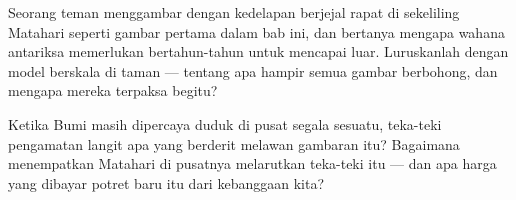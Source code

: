 \begin{exercise}[$\star\star$]\label{exo:g4:solar-system:10}
Seorang teman menggambar  dengan kedelapan  berjejal
rapat di sekeliling Matahari seperti gambar pertama dalam bab ini, dan
bertanya mengapa wahana antariksa memerlukan bertahun-tahun untuk
mencapai  luar. Luruskanlah dengan model berskala di taman ---
tentang apa hampir semua gambar  berbohong, dan mengapa
mereka terpaksa begitu?
\end{exercise}

\begin{exercise}[$\star\star$]\label{exo:g4:solar-system:11}
Ketika Bumi masih dipercaya duduk di pusat segala sesuatu, teka-teki
pengamatan langit apa yang berderit melawan gambaran itu? Bagaimana
menempatkan Matahari di pusatnya melarutkan teka-teki itu --- dan apa
harga yang dibayar potret baru itu dari kebanggaan kita?
\end{exercise}
